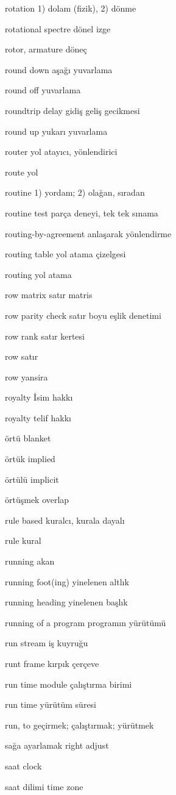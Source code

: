 \documentclass[12pt,fleqn]{article}\usepackage{../../common}
\begin{document}
rotation 1) dolam (fizik), 2) dönme

rotational spectre dönel izge

rotor, armature döneç

round down aşağı yuvarlama

round off yuvarlama

roundtrip delay gidiş geliş gecikmesi

round up yukarı yuvarlama

router yol atayıcı, yönlendirici

route yol

routine 1) yordam; 2) olağan, sıradan

routine test parça deneyi, tek tek sınama

routing-by-agreement anlaşarak yönlendirme

routing table yol atama çizelgesi

routing yol atama

row matrix satır matris

row parity check satır boyu eşlik denetimi

row rank satır kertesi

row satır

row yansira

royalty İsim hakkı

royalty telif hakkı

örtü blanket

örtük implied

örtülü implicit

örtüşmek overlap

rule based kuralcı, kurala dayalı

rule kural

running akan

running foot(ing) yinelenen altlık

running heading yinelenen başlık

running of a program programın yürütümü

run stream iş kuyruğu

runt frame kırpık çerçeve

run time module çalıştırma birimi

run time yürütüm süresi

run, to geçirmek; çalıştırmak; yürütmek

sağa ayarlamak right adjust

saat clock

saat dilimi time zone
\end{document}

